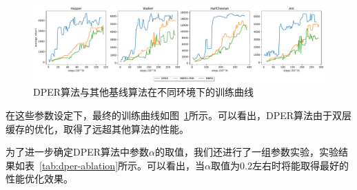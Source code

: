 \begin{figure}
  \centering
  \includegraphics[width=\textwidth]{figures/dler.pdf}
  \caption{DPER算法与其他基线算法在不同环境下的训练曲线}
  \label{fig:dper-performance}
\end{figure}

在这些参数设定下，最终的训练曲线如图~\ref{fig:dper-performance}所示。可以看出，DPER算法由于双层缓存的优化，取得了远超其他算法的性能。

为了进一步确定DPER算法中参数$\alpha$的取值，我们还进行了一组参数实验，实验结果如表~\ref{tab:dper-ablation}所示。可以看出，当$\alpha$取值为0.2左右时将能取得最好的性能优化效果。

\begin{table}
\centering
{}
\caption{Result of Ablation Study}
\label{tab:dper-ablation}
\end{table}